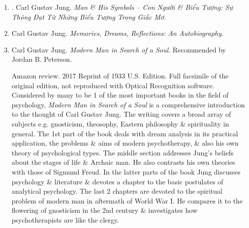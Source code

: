 \documentclass{article}
\begin{document}
\begin{enumerate}
	{\sf About the Author.} {\sc Carl Gustav Jung} (1875--1961) was a Swiss psychiatrist, an influential thinker \& the founder of analytical psychology (also known as Jungian psychology). Jung's radical approach to psychology has been influential in the field of depth psychology \& in counter-cultural movements across the globe. {\sc Jung}'s radical approach to psychology has been influential in the field of depth psychology \& in counter-cultural movements across the globe. {\sc Jung} is considered the 1st modern psychologist to state that the human psyche is ``by nature religious'' \& to explore it in depth. His major works include ``Analytic Psychology: Its Theory \& Practice'', ``Man \& His Symbols,'' ``Memories, Dreams, Reflections'', ``The Collected Works of Carl G. Jung'', \& ``The Red Book''.
	\item \cite{Jung_man_symbol_VN}. {\sc Carl Gustav Jung}. {\it Man \& His Symbols -- Con Người \& Biểu Tượng: Sự Thông Đạt Từ Những Biểu Tượng Trong Giấc Mơ}.\hfill{\sf[done]}
	\item {\sc Carl Gustav Jung}. {\it Memories, Dreams, Reflections: An Autobiography}.
	\item {\sc Carl Gustav Jung}. {\it Modern Man in Search of a Soul}. {} Recommended by {\sc Jordan B. Peterson}.
	
	{\sf Amazon review.} 2017 Reprint of 1933 U.S. Edition. Full facsimile of the original edition, not reproduced with Optical Recognition software. Considered by many to be 1 of the most important books in the field of psychology, {\it Modern Man in Search of a Soul} is a comprehensive introduction to the thought of {\sc Carl Gustav Jung}. The writing covers a broad array of subjects e.g. gnosticism, theosophy, Eastern philosophy \& spirituality in general. The 1st part of the book deals with dream analysis in its practical application, the problems \& aims of modern psychotherapy, \& also his own theory of psychological types. The middle section addresses {\sc Jung}'s beliefs about the stages of life \& Archaic man. He also contrasts his own theories with those of {\sc Sigmund Freud}. In the latter parts of the book {\sc Jung} discusses psychology \& literature \& devotes a chapter to the basic postulates of analytical psychology. The last 2 chapters are devoted to the spiritual problem of modern man in aftermath of World War I. He compares it to the flowering of gnosticism in the 2nd century \& investigates how psychotherapists are like the clergy.
	

\end{enumerate}
\end{document}
